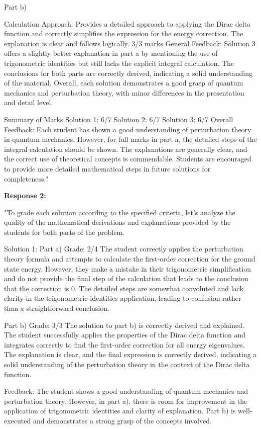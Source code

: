 \documentclass[a4paper,11pt]{article}
\begin{document}
Part b)

Calculation Approach: Provides a detailed approach to applying the Dirac delta function and correctly simplifies the expression for the energy correction. The explanation is clear and follows logically. 3/3 marks
General Feedback: Solution 3 offers a slightly better explanation in part a by mentioning the use of trigonometric identities but still lacks the explicit integral calculation. The conclusions for both parts are correctly derived, indicating a solid understanding of the material. Overall, each solution demonstrates a good grasp of quantum mechanics and perturbation theory, with minor differences in the presentation and detail level.

Summary of Marks
Solution 1: 6/7
Solution 2: 6/7
Solution 3: 6/7
Overall Feedback: Each student has shown a good understanding of perturbation theory in quantum mechanics. However, for full marks in part a, the detailed steps of the integral calculation should be shown. The explanations are generally clear, and the correct use of theoretical concepts is commendable. Students are encouraged to provide more detailed mathematical steps in future solutions for completeness."

\textbf{Response 2:}

"To grade each solution according to the specified criteria, let's analyze the quality of the mathematical derivations and explanations provided by the students for both parts of the problem.

Solution 1:
Part a) Grade: 2/4
The student correctly applies the perturbation theory formula and attempts to calculate the first-order correction for the ground state energy. However, they make a mistake in their trigonometric simplification and do not provide the final step of the calculation that leads to the conclusion that the correction is 0. The detailed steps are somewhat convoluted and lack clarity in the trigonometric identities application, leading to confusion rather than a straightforward conclusion.

Part b) Grade: 3/3
The solution to part b) is correctly derived and explained. The student successfully applies the properties of the Dirac delta function and integrates correctly to find the first-order correction for all energy eigenvalues. The explanation is clear, and the final expression is correctly derived, indicating a solid understanding of the perturbation theory in the context of the Dirac delta function.

Feedback:
The student shows a good understanding of quantum mechanics and perturbation theory. However, in part a), there is room for improvement in the application of trigonometric identities and clarity of explanation. Part b) is well-executed and demonstrates a strong grasp of the concepts involved.
\end{document}
